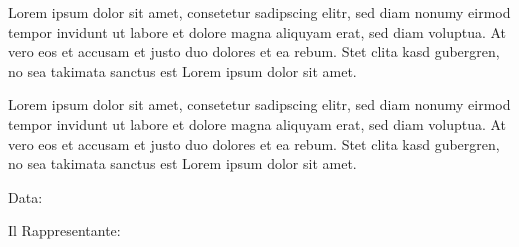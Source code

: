 \documentclass{article}
\begin{document}
Lorem ipsum dolor sit amet, consetetur sadipscing elitr, sed diam nonumy eirmod
tempor invidunt ut labore et dolore magna aliquyam erat, sed diam voluptua. At
vero eos et accusam et justo duo dolores et ea rebum. Stet clita kasd gubergren,
no sea takimata sanctus est Lorem ipsum dolor sit amet.

Lorem ipsum dolor sit amet, consetetur sadipscing elitr, sed diam nonumy eirmod
tempor invidunt ut labore et dolore magna aliquyam erat, sed diam voluptua. At
vero eos et accusam et justo duo dolores et ea rebum. Stet clita kasd gubergren,
no sea takimata sanctus est Lorem ipsum dolor sit amet.

\vspace{3cm}
Data: %

Il Rappresentante:

\vspace{0.5cm}




\vspace{0.2cm}


\end{document}
